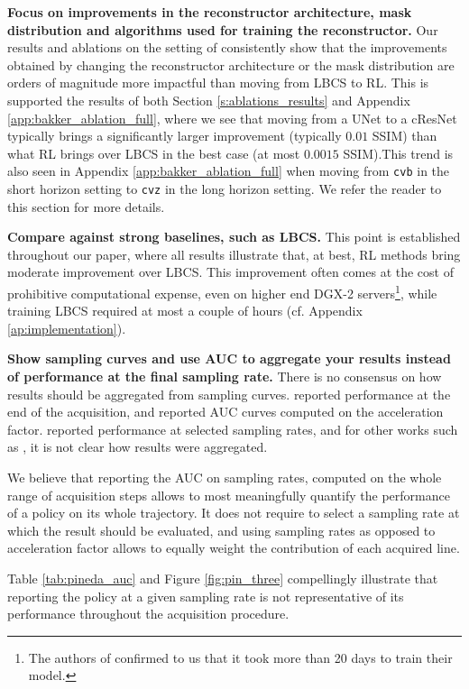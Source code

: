 \textbf{Focus on improvements in the reconstructor architecture, mask distribution and algorithms used for training the reconstructor.} 
Our results and ablations on the setting of \citet{bakker2020experimental} consistently show that the improvements obtained by changing the reconstructor architecture or the mask distribution are orders of magnitude more impactful than moving from LBCS to RL. This is supported the results of both Section \ref{s:ablations_results} and Appendix \ref{app:bakker_ablation_full}, where we see that moving from a UNet to a cResNet typically brings a significantly larger improvement (typically $0.01$ SSIM) than what RL brings over LBCS in the best case (at most $0.0015$ SSIM).This trend is also seen in Appendix \ref{app:bakker_ablation_full} when moving from \texttt{cvb} in the short horizon setting to \texttt{cvz} in the long horizon setting. We refer the reader to this section for more details.


\textbf{Compare against strong baselines, such as LBCS.} This point is established throughout our paper, where all results illustrate that, at best, RL methods bring moderate improvement over LBCS. This improvement often comes at the cost of prohibitive computational expense, even on higher end DGX-2 servers\footnote{The authors of \citep{pineda2020active} confirmed to us that it took more than 20 days to train their model.}, while training LBCS required at most a couple of hours (cf. Appendix \ref{ap:implementation}).

\textbf{Show sampling curves and use AUC to aggregate your results instead of performance at the final sampling rate.}
There is no consensus on how results should be aggregated from sampling curves. \citet{bakker2020experimental,van2021active} reported performance at the end of the acquisition, and \citet{pineda2020active} reported AUC curves computed on the acceleration factor. \citet{gozcu2018learning,yin2021end} reported performance at selected sampling rates, and for other works such as \citet{jin2019self}, it is not clear how results were aggregated.

We believe that reporting the AUC on sampling rates, computed on the whole range of acquisition steps allows to most meaningfully quantify the performance of a policy on its whole trajectory. It does not require to select a sampling rate at which the result should be evaluated, and using sampling rates as opposed to acceleration factor allows to equally weight the contribution of each acquired line. 

Table \ref{tab:pineda_auc} and Figure \ref{fig:pin_three} compellingly illustrate that reporting the policy at a given sampling rate is not representative of its performance throughout the acquisition procedure. 

